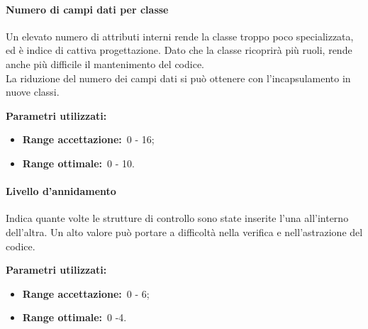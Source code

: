 			\paragraph{Numero di campi dati per classe}
				\label{sec:3.9.3.3}
				Un elevato numero di attributi interni rende la classe troppo poco specializzata, ed è indice di cattiva progettazione. Dato che la classe ricoprirà più ruoli, rende anche più difficile il mantenimento del codice. \\
				La riduzione del numero dei campi dati si può ottenere con l'incapsulamento in nuove classi.
				
				\textbf{Parametri utilizzati:}
				\begin{itemize}
					\item \textbf{Range accettazione:}\ 0 - 16;
					\item \textbf{Range ottimale:}\ 0 - 10.
				\end{itemize}
			\paragraph{Livello d'annidamento}
				\label{sec:3.9.3.4}
				Indica quante volte le strutture di controllo sono state inserite l'una all'interno dell'altra. Un alto valore può portare a difficoltà nella verifica e nell'astrazione del codice.
				
				\textbf{Parametri utilizzati:}
				\begin{itemize}
					\item \textbf{Range accettazione:}\ 0 - 6;
					\item \textbf{Range ottimale:}\ 0 -4.
				\end{itemize}
